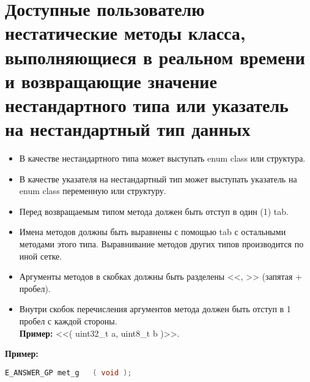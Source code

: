 \section{Доступные пользователю нестатические методы класса, выполняющиеся в реальном времени и возвращающие значение нестандартного типа или указатель на нестандартный тип данных}\label{dp:n:n}
\begin{itemize}
	\item В качестве нестандартного типа может выступать enum class или структура.
	\item В качестве указателя на нестандартный тип может выступать указатель на enum class переменную или структуру.
	\item Перед возвращаемым типом метода должен быть отступ в один (1) tab.
	\item Имена методов должны быть выравнены с помощью tab с остальными методами этого типа. Выравнивание методов других типов производится по иной сетке.
	\item Аргументы методов в скобках должны быть разделены <<, >> (запятая + пробел).
	\item Внутри скобок перечисления аргументов метода должен быть отступ в 1 пробел с каждой стороны.\\\textbf{Пример: } <<( uint32\_t a, uint8\_t b )>>.
\end{itemize}
\textbf{Пример:}\begin{lstlisting}[language=C++, frame=tlBR, basicstyle=\fontsize{10}{10}\ttfamily]
	E_ANSWER_GP	met_g	( void );
\end{lstlisting}


